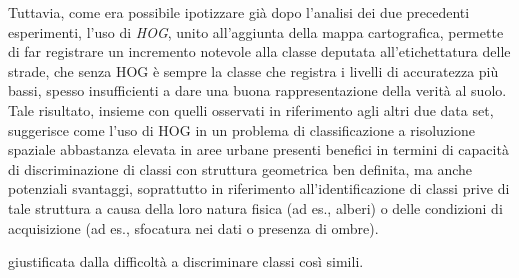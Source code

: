 Tuttavia, come era possibile ipotizzare già dopo l'analisi dei due
precedenti esperimenti, l'uso di \emph{HOG}, unito all'aggiunta della
mappa cartografica, permette di far registrare un incremento notevole
alla classe deputata all'etichettatura delle strade, che senza HOG è
sempre la classe che registra i livelli di accuratezza più bassi,
spesso insufficienti a dare una buona rappresentazione della verità al
suolo. Tale risultato, insieme con quelli osservati in riferimento
agli altri due data set, suggerisce come l'uso di HOG in un problema
di classificazione a risoluzione spaziale abbastanza elevata in aree
urbane presenti benefici in termini di capacità di discriminazione di
classi con struttura geometrica ben definita, ma anche potenziali
svantaggi, soprattutto in riferimento all'identificazione di classi
prive di tale struttura a causa della loro natura fisica (ad es.,
alberi) o delle condizioni di acquisizione (ad es., sfocatura nei dati
o presenza di ombre).

%



giustificata dalla difficoltà a discriminare classi così simili.
